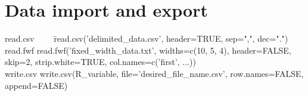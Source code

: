 \documentclass{report}
\begin{document}
	\section{Data import and export}
\begin{tabbing}
read.csv~~~~ \= read.csv('delimited\_data.csv', header=TRUE, sep=",", dec=".") \\
read.fwf \> read.fwf('fixed\_width\_data.txt', widths=c(10, 5, 4), header=FALSE, skip=2, strip.white=TRUE, col.names=c('first', ...)) \\
write.csv \> write.csv(R\_variable, file='desired\_file\_name.csv', row.names=FALSE, append=FALSE)
\end{tabbing}

\printbibliography

\printnoidxglossaries
\end{document}
